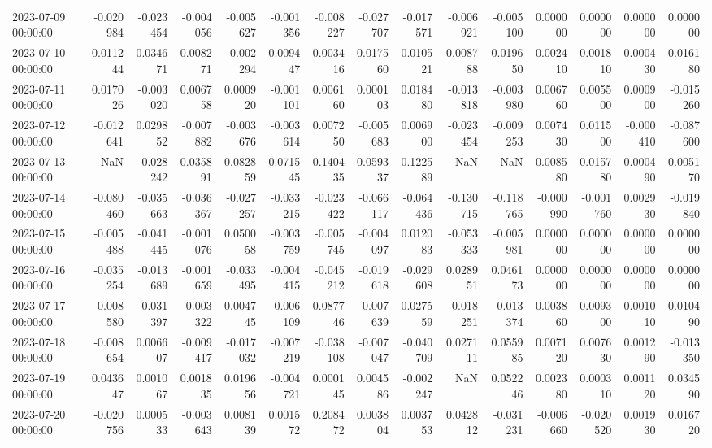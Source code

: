 \begin{tabular}{lrrrrrrrrrrrrrr}
2023-07-09 00:00:00 & -0.020984 & -0.023454 & -0.004056 & -0.005627 & -0.001356 & -0.008227 & -0.027707 & -0.017571 & -0.006921 & -0.005100 & 0.000000 & 0.000000 & 0.000000 & 0.000000 \\
2023-07-10 00:00:00 & 0.011244 & 0.034671 & 0.008271 & -0.002294 & 0.009447 & 0.003416 & 0.017560 & 0.010521 & 0.008788 & 0.019650 & 0.002410 & 0.001810 & 0.000430 & 0.016180 \\
2023-07-11 00:00:00 & 0.017026 & -0.003020 & 0.006758 & 0.000920 & -0.001101 & 0.006160 & 0.000103 & 0.018480 & -0.013818 & -0.003980 & 0.006760 & 0.005500 & 0.000900 & -0.015260 \\
2023-07-12 00:00:00 & -0.012641 & 0.029852 & -0.007882 & -0.003676 & -0.003614 & 0.007250 & -0.005683 & 0.006900 & -0.023454 & -0.009253 & 0.007430 & 0.011500 & -0.000410 & -0.087600 \\
2023-07-13 00:00:00 & NaN & -0.028242 & 0.035891 & 0.082859 & 0.071545 & 0.140435 & 0.059337 & 0.122589 & NaN & NaN & 0.008580 & 0.015780 & 0.000490 & 0.005170 \\
2023-07-14 00:00:00 & -0.080460 & -0.035663 & -0.036367 & -0.027257 & -0.033215 & -0.023422 & -0.066117 & -0.064436 & -0.130715 & -0.118765 & -0.000990 & -0.001760 & 0.002930 & -0.019840 \\
2023-07-15 00:00:00 & -0.005488 & -0.041445 & -0.001076 & 0.050058 & -0.003759 & -0.005745 & -0.004097 & 0.012083 & -0.053333 & -0.005981 & 0.000000 & 0.000000 & 0.000000 & 0.000000 \\
2023-07-16 00:00:00 & -0.035254 & -0.013689 & -0.001659 & -0.033495 & -0.004415 & -0.045212 & -0.019618 & -0.029608 & 0.028951 & 0.046173 & 0.000000 & 0.000000 & 0.000000 & 0.000000 \\
2023-07-17 00:00:00 & -0.008580 & -0.031397 & -0.003322 & 0.004745 & -0.006109 & 0.087746 & -0.007639 & 0.027559 & -0.018251 & -0.013374 & 0.003860 & 0.009300 & 0.001010 & 0.010490 \\
2023-07-18 00:00:00 & -0.008654 & 0.006607 & -0.009417 & -0.017032 & -0.007219 & -0.038108 & -0.007047 & -0.040709 & 0.027111 & 0.055985 & 0.007120 & 0.007630 & 0.001290 & -0.013350 \\
2023-07-19 00:00:00 & 0.043647 & 0.001067 & 0.001835 & 0.019656 & -0.004721 & 0.000145 & 0.004586 & -0.002247 & NaN & 0.052246 & 0.002380 & 0.000310 & 0.001120 & 0.034590 \\
2023-07-20 00:00:00 & -0.020756 & 0.000533 & -0.003643 & 0.008139 & 0.001572 & 0.208472 & 0.003804 & 0.003753 & 0.042812 & -0.031231 & -0.006660 & -0.020520 & 0.001930 & 0.016720 \\

\end{tabular}
